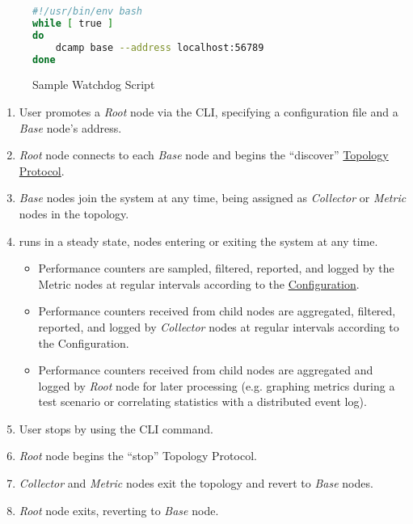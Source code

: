 \begin{figure}[H]
\vspace{+10pt}
\begin{lstlisting}[language=bash,frame=single,basicstyle=\footnotesize\ttfamily]
#!/usr/bin/env bash
while [ true ]
do
    dcamp base --address localhost:56789
done
\end{lstlisting}
\vspace{-10pt}
\caption{Sample Watchdog Script}
\label{fig:sample_watchdog}
\end{figure}

\begin{enumerate}

\item User promotes a \textit{Root} node via the \dcamp CLI, specifying a configuration file and a \textit{Base} node's
      address.
\item \textit{Root} node connects to each \textit{Base} node and begins the ``discover'' \hyperref[proto_topo]{Topology
      Protocol}.
\item \textit{Base} nodes join the \dcamp system at any time, being assigned as \textit{Collector} or \textit{Metric}
      nodes in the topology.

\item \dcamp runs in a steady state, nodes entering or exiting the system at any time.

      \begin{itemize}
      \item Performance counters are sampled, filtered, reported, and logged by the Metric nodes at regular intervals
            according to the \hyperref[configuration]{\dcamp Configuration}.
      \item Performance counters received from child nodes are aggregated, filtered, reported, and logged by
            \textit{Collector} nodes at regular intervals according to the \dcamp Configuration.
      \item Performance counters received from child nodes are aggregated and logged by \textit{Root} node for later
	    processing (e.g. graphing metrics during a test scenario or correlating statistics with a distributed event
	    log).
      \end{itemize}

\item User stops \dcamp by using the \dcamp CLI command.
\item \textit{Root} node begins the ``stop'' Topology Protocol.
\item \textit{Collector} and \textit{Metric} nodes exit the topology and revert to \textit{Base} nodes.
\item \textit{Root} node exits, reverting to \textit{Base} node.

\end{enumerate}

